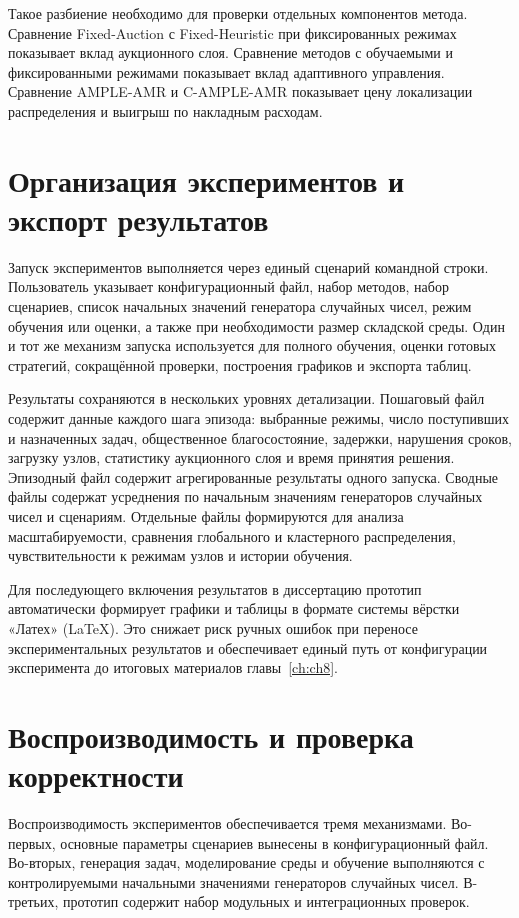 Такое разбиение необходимо для проверки отдельных компонентов метода. Сравнение Fixed-Auction с Fixed-Heuristic при фиксированных режимах показывает вклад аукционного слоя. Сравнение методов с обучаемыми и фиксированными режимами показывает вклад адаптивного управления. Сравнение AMPLE-AMR и C-AMPLE-AMR показывает цену локализации распределения и выигрыш по накладным расходам.

\section{Организация экспериментов и экспорт результатов}

Запуск экспериментов выполняется через единый сценарий командной строки. Пользователь указывает конфигурационный файл, набор методов, набор сценариев, список начальных значений генератора случайных чисел, режим обучения или оценки, а также при необходимости размер складской среды. Один и тот же механизм запуска используется для полного обучения, оценки готовых стратегий, сокращённой проверки, построения графиков и экспорта таблиц.

Результаты сохраняются в нескольких уровнях детализации. Пошаговый файл содержит данные каждого шага эпизода: выбранные режимы, число поступивших и назначенных задач, общественное благосостояние, задержки, нарушения сроков, загрузку узлов, статистику аукционного слоя и время принятия решения. Эпизодный файл содержит агрегированные результаты одного запуска. Сводные файлы содержат усреднения по начальным значениям генераторов случайных чисел и сценариям. Отдельные файлы формируются для анализа масштабируемости, сравнения глобального и кластерного распределения, чувствительности к режимам узлов и истории обучения.

Для последующего включения результатов в диссертацию прототип автоматически формирует графики и таблицы в формате системы вёрстки «Латех» (\LaTeX). Это снижает риск ручных ошибок при переносе экспериментальных результатов и обеспечивает единый путь от конфигурации эксперимента до итоговых материалов главы~\ref{ch:ch8}.

\section{Воспроизводимость и проверка корректности}

Воспроизводимость экспериментов обеспечивается тремя механизмами. Во-первых, основные параметры сценариев вынесены в конфигурационный файл. Во-вторых, генерация задач, моделирование среды и обучение выполняются с контролируемыми начальными значениями генераторов случайных чисел. В-третьих, прототип содержит набор модульных и интеграционных проверок.

